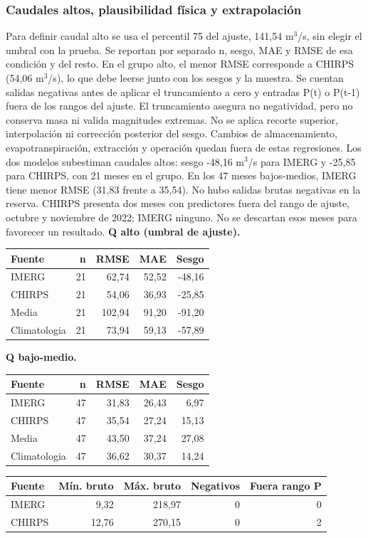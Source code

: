 \subsubsection*{Caudales altos, plausibilidad física y extrapolación}
Para definir caudal alto se usa el percentil 75 del ajuste, 141,54 m$^3$/s, sin elegir el umbral con la prueba. Se reportan por separado n, sesgo, MAE y RMSE de esa condición y del resto. En el grupo alto, el menor RMSE corresponde a CHIRPS (54,06 m$^3$/s), lo que debe leerse junto con los sesgos y la muestra. Se cuentan salidas negativas antes de aplicar el truncamiento a cero y entradas P(t) o P(t-1) fuera de los rangos del ajuste. El truncamiento asegura no negatividad, pero no conserva masa ni valida magnitudes extremas. No se aplica recorte superior, interpolación ni corrección posterior del sesgo. Cambios de almacenamiento, evapotranspiración, extracción y operación quedan fuera de estas regresiones. Los dos modelos subestiman caudales altos: sesgo -48,16 m$^3$/s para IMERG y -25,85 para CHIRPS, con 21 meses en el grupo. En los 47 meses bajos-medios, IMERG tiene menor RMSE (31,83 frente a 35,54). No hubo salidas brutas negativas en la reserva. CHIRPS presenta dos meses con predictores fuera del rango de ajuste, octubre y noviembre de 2022; IMERG ninguno. No se descartan esos meses para favorecer un resultado.
\textbf{Q alto (umbral de ajuste).}\begin{center}\small\begin{tabular}{lrrrr}\hline
Fuente & n & RMSE & MAE & Sesgo \\ \hline
IMERG & 21 & 62,74 & 52,52 & -48,16 \\
CHIRPS & 21 & 54,06 & 36,93 & -25,85 \\
Media & 21 & 102,94 & 91,20 & -91,20 \\
Climatologia & 21 & 73,94 & 59,13 & -57,89 \\
\hline\end{tabular}\end{center}
\textbf{Q bajo-medio.}\begin{center}\small\begin{tabular}{lrrrr}\hline
Fuente & n & RMSE & MAE & Sesgo \\ \hline
IMERG & 47 & 31,83 & 26,43 & 6,97 \\
CHIRPS & 47 & 35,54 & 27,24 & 15,13 \\
Media & 47 & 43,50 & 37,24 & 27,08 \\
Climatologia & 47 & 36,62 & 30,37 & 14,24 \\
\hline\end{tabular}\end{center}
\begin{center}\small\begin{tabular}{lrrrr}\hline
Fuente & Mín. bruto & Máx. bruto & Negativos & Fuera rango P \\ \hline
IMERG & 9,32 & 218,97 & 0 & 0 \\
CHIRPS & 12,76 & 270,15 & 0 & 2 \\
\hline\end{tabular}\end{center}
